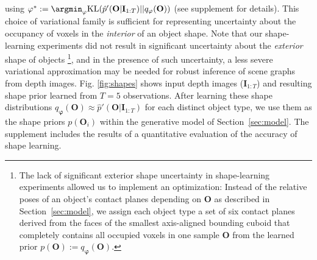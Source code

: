 using $\varphi^* := \argmin_{\varphi} \mathrm{KL}(\hat{p}'(\mathbf{O} | \mathbf{I}_{1:T}) || q_{\varphi}(\mathbf{O}))$
(see supplement for details).
This choice of variational family is sufficient for representing uncertainty about the occupancy of voxels in the \emph{interior} of an object shape.
Note that our shape-learning experiments did not result in significant uncertainty about the \emph{exterior} shape of objects%
\footnote{%
The lack of significant exterior shape uncertainty in shape-learning experiments allowed us to
implement an optimization:
Instead of the relative poses of an object's contact planes depending on $\mathbf{O}$ as described in Section~\ref{sec:model},
we assign each object type a set of six contact planes derived from the faces of the smallest axis-aligned bounding cuboid that completely contains all occupied voxels in one sample $\mathbf{O}$ from the learned prior $p(\mathbf{O}) := q_{\bm{\varphi}}(\mathbf{O})$.
},
and in the presence of such uncertainty, a less severe variational approximation may be needed for robust inference of scene graphs from depth images.
Fig. \ref{fig:shapes} shows input depth images ($\mathbf{I}_{1:T}$) and resulting shape prior learned from $T=5$ observations.
After learning these shape distributions $q_{\bm{\varphi}}(\mathbf{O}) \approx \hat{p}'(\mathbf{O} | \mathbf{I}_{1:T})$ for each distinct object type, we use them as the shape priors $p(\mathbf{O}_i)$ within the generative model of Section~\ref{sec:model}. The supplement includes the results of a quantitative evaluation of the accuracy of shape learning.

